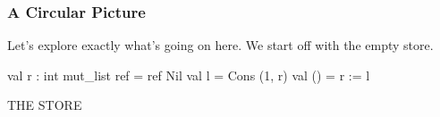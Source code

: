 \documentclass[aspectratio=169, handout]{beamer}
\newcommand{\topthing}[2]{
      \begin{minipage}[t][#1][t]{\textwidth}
        \vspace{\fill}
        #2
        \vspace{\fill}
      \end{minipage}
    }
\begin{document}
\begin{frame}[fragile]
  \frametitle{A Circular Picture}

  \topthing{0.2in}{
    Let's explore exactly what's going on here. We start off with the empty store.
  }

  \vspace{10pt}

  \begin{center}
    \begin{minipage}[t][2.1in][t]{0.55\textwidth}
      \vspace{\fill}
      \small
      \begin{codeblock}
        val r : int mut_list ref = ref Nil
        val l = Cons (1, r)
        val () = r := l
      \end{codeblock}
      \vspace{\fill}
    \end{minipage}
    \hfill\vline\hfill
    \begin{minipage}[t][2.1in][t]{0.35\textwidth}
      \centering
      {\hspace{-20pt}\color{gray} \large THE STORE}

      \vspace{\fill}
      \begin{tikzpicture}
      \end{tikzpicture}
      \vspace{\fill}
    \end{minipage}
  \end{center}
\end{frame}
\end{document}
